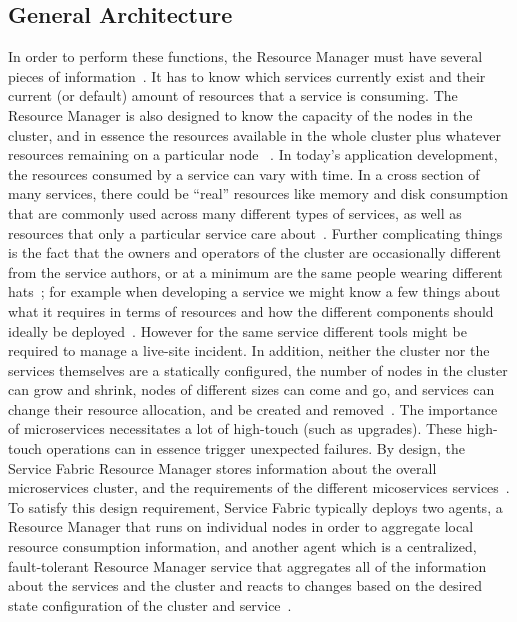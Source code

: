 \subsection{General Architecture}
In order to perform these functions, the Resource Manager must have
several pieces of information~\cite{hid-sp18-501-fig2and3}.  It has to
know which services currently exist and their current (or default)
amount of resources that a service is consuming. The Resource Manager
is also designed to know the capacity of the nodes in the cluster, and
in essence the resources available in the whole cluster plus whatever
resources remaining on a particular node
~\cite{hid-sp18-501-fig2and3}. In today's application development, the
resources consumed by a service can vary with time.  In a cross
section of many services, there could be ``real'' resources like memory
and disk consumption that are commonly used across many different
types of services, as well as resources that only a particular service
care about~\cite{hid-sp18-501-fig2and3}.  Further complicating things
is the fact that the owners and operators of the cluster are
occasionally different from the service authors, or at a minimum are
the same people wearing different hats~\cite{hid-sp18-501-fig2and3}; 
for example when developing a
service we might know a few things about what it requires in terms of
resources and how the different components should ideally be
deployed~\cite{hid-sp18-501-fig2and3}. However for the same service
different tools might be required to manage a live-site incident. In
addition, neither the cluster nor the services themselves are a
statically configured, the number of nodes in the cluster can grow and
shrink, nodes of different sizes can come and go, and services can
change their resource allocation, and be created and
removed~\cite{hid-sp18-501-fig2and3}.  The importance of microservices
necessitates a lot of high-touch (such as upgrades).  These high-touch
operations can in essence trigger unexpected failures. By design, the
Service Fabric Resource Manager stores information about the overall
microservices cluster, and the requirements of the different
micoservices services~\cite{hid-sp18-501-fig2and3}. To satisfy this
design requirement, Service
Fabric typically deploys two agents, a Resource Manager that runs on
individual nodes in order to aggregate local resource consumption
information, and another agent which is a centralized, fault-tolerant
Resource Manager service that aggregates all of the information about
the services and the cluster and reacts to changes based on the
desired state configuration of the cluster and
service~\cite{hid-sp18-501-fig2and3}.

